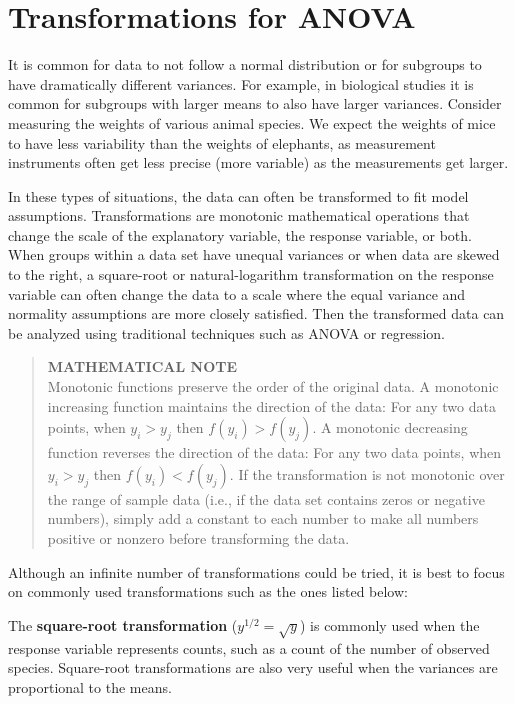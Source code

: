 \documentclass[
]{report}
\begin{document}
\section*{Transformations for ANOVA}\label{transformations-for-anova}

It is common for data to not follow a normal distribution or for subgroups to have dramatically different variances. For example, in biological studies it is common for subgroups with larger means to also have larger variances. Consider measuring the weights of various animal species. We expect the weights of mice to have less variability than the weights of elephants, as measurement instruments often get less precise (more variable) as the measurements get larger.

In these types of situations, the data can often be transformed to fit model assumptions. Transformations are monotonic mathematical operations that change the scale of the explanatory variable, the response variable, or both. When groups within a data set have unequal variances or when data are skewed to the right, a square-root or natural-logarithm transformation on the response variable can often change the data to a scale where the equal variance and normality assumptions are more closely satisfied. Then the transformed data can be analyzed using traditional techniques such as ANOVA or regression.

\begin{quote}
\textbf{MATHEMATICAL NOTE}\\
Monotonic functions preserve the order of the original data. A monotonic increasing function maintains the direction of the data: For any two data points, when \(y_i > y_j\) then \(f(y_i) > f(y_j)\). A monotonic decreasing function reverses the direction of the data: For any two data points, when \(y_i > y_j\) then \(f(y_i) < f(y_j)\). If the transformation is not monotonic over the range of sample data (i.e., if the data set contains zeros or negative numbers), simply add a constant to each number to make all numbers positive or nonzero before transforming the data.
\end{quote}

Although an infinite number of transformations could be tried, it is best to focus on commonly used transformations such as the ones listed below:

The \textbf{square-root transformation} (\(y^{1/2} = \sqrt{y}\)) is commonly used when the response variable represents counts, such as a count of the number of observed species. Square-root transformations are also very useful when the variances are proportional to the means.
\end{document}
